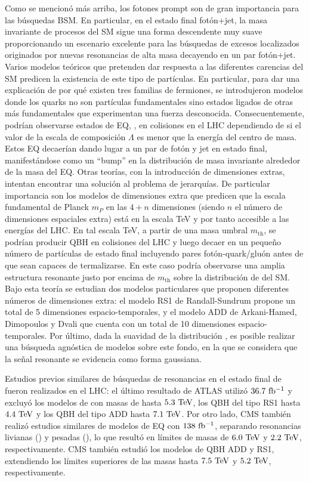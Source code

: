 Como se mencionó más arriba, los fotones prompt son de gran importancia para las búsquedas \ac{BSM}. En particular, en el estado final fotón+jet, la masa invariante de procesos del \ac{SM} sigue una forma descendente muy suave proporcionando un escenario excelente para las búsquedas de excesos localizados originados por nuevas resonancias de alta masa decayendo en  un par fotón+jet. Varios modelos teóricos que pretenden dar respuesta a las diferentes carencias del \ac{SM} predicen la existencia de este tipo de partículas. En particular, para dar una explicación de por qué existen tres familias de fermiones, se introdujeron modelos donde los quarks no son partículas fundamentales sino estados ligados de otras más fundamentales que experimentan una fuerza desconocida. Consecuentemente, podrían observarse estados de \ac{EQ}, \qstar,  en colisiones \pp en el \ac{LHC} dependiendo de si el valor de la escala de composición \(\Lambda\) es menor que la energía del centro de masa. Estos \ac{EQ} decaerían dando lugar a un par de fotón y jet en estado final, manifestándose como un \enquote{bump} en la distribución de masa invariante \myj alrededor de la masa del \ac{EQ}. Otras teorías, con la introducción de dimensiones extras, intentan encontrar una solución al problema de jerarquías. De particular importancia son los modelos de dimensiones extra que predicen que la escala fundamental de Planck \(m_P\) en las \(4 + n\) dimensiones (siendo \(n\) el número de dimensiones espaciales extra) está en la escala TeV y por tanto accesible a las energías del \ac{LHC}. En tal escala TeV, a partir de una masa umbral \(m_{\text{th}}\), se podrían producir \ac{QBH} en colisiones \pp del \ac{LHC} y luego decaer en un pequeño número de partículas de estado final incluyendo pares fotón-quark/gluón antes de que sean capaces de termalizarse. En este caso podría observarse una amplia estructura resonante justo por encima de \(m_{\text{th}}\) sobre la distribución de \myj del \ac{SM}. Bajo esta teoría se estudian dos modelos particulares que proponen diferentes números de dimensiones extra: el modelo RS1 de Randall-Sundrum propone un total de 5 dimensiones espacio-temporales, y el modelo ADD de Arkani-Hamed, Dimopoulos y Dvali que cuenta con un total de 10 dimensiones espacio-temporales. Por último, dada la suavidad de la distribución \myj, es posible realizar una búsqueda agnóstica de modelos sobre este fondo, en la que se considera que la señal resonante se evidencia como forma gaussiana. 

Estudios previos similares de búsquedas de resonancias en el estado final de \gammajet fueron realizados en el \ac{LHC}: el último resultado de \ac{ATLAS} utilizó \(36.7~\ifb\) y excluyó los modelos de \qstar con masas de hasta \(5.3~\TeV\), los \ac{QBH} del tipo RS1 hasta \(4.4~\TeV\) y los \ac{QBH} del tipo ADD hasta \(7.1~\TeV\). Por otro lado, \ac{CMS} también realizó estudios similares de modelos de \ac{EQ} con \(138~\ifb\), separando resonancias livianas (\qstar) y pesadas (\bstar), lo que resultó en límites de masas de \(6.0~\TeV\) y \(2.2~\TeV\), respectivamente. \ac{CMS} también estudió los modelos de \ac{QBH} ADD y RS1, extendiendo los límites superiores de las masas hasta \(7.5~\TeV\) y \(5.2~\TeV\), respectivamente.

